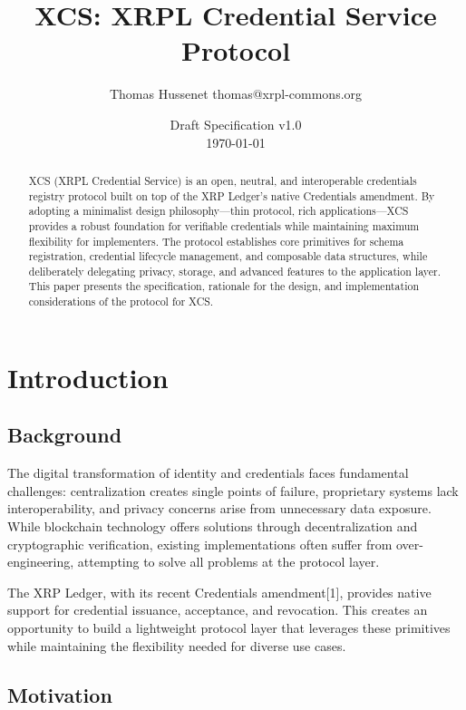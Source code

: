 \documentclass[11pt,a4paper]{article}
\title{\Large \textbf{XCS: XRPL Credential Service Protocol}}
\author{Thomas Hussenet thomas@xrpl-commons.org}
\date{Draft Specification v1.0 \\ \today}
\begin{document}
\maketitle

\begin{abstract}
\noindent
XCS (XRPL Credential Service) is an open, neutral, and interoperable credentials registry protocol built on top of the XRP Ledger's native Credentials amendment. By adopting a minimalist design philosophy—thin protocol, rich applications—XCS provides a robust foundation for verifiable credentials while maintaining maximum flexibility for implementers. The protocol establishes core primitives for schema registration, credential lifecycle management, and composable data structures, while deliberately delegating privacy, storage, and advanced features to the application layer. This paper presents the specification, rationale for the design, and implementation considerations of the protocol for XCS.
\end{abstract}

\tableofcontents
\newpage

\section{Introduction}

\subsection{Background}

The digital transformation of identity and credentials faces fundamental challenges: centralization creates single points of failure, proprietary systems lack interoperability, and privacy concerns arise from unnecessary data exposure. While blockchain technology offers solutions through decentralization and cryptographic verification, existing implementations often suffer from over-engineering, attempting to solve all problems at the protocol layer.

The XRP Ledger, with its recent Credentials amendment[1], provides native support for credential issuance, acceptance, and revocation. This creates an opportunity to build a lightweight protocol layer that leverages these primitives while maintaining the flexibility needed for diverse use cases.

\subsection{Motivation}
\end{document}
